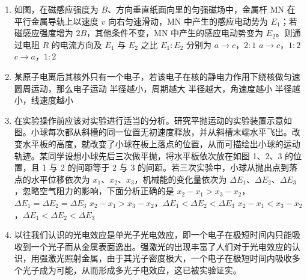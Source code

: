 \documentclass[\gkver]{gaokaozhenti}
\begin{document}
\begin{enumerate}
\item
如图，在磁感应强度为 $B$、方向垂直纸面向里的匀强磁场中，金属杆 MN 在平行金属导轨上以速度 $v$ 向右匀速滑动，MN 中产生的感应电动势为 $E_{1}$；若磁感应强度增为 $2B$，其他条件不变，MN 中产生的感应电动势变为 $E_{2}$。则通过电阻 $R$ 的电流方向及 $E_{1}$ 与 $E_{2}$ 之比 $E_{1}:E_{2}$ 分别为
{$a\to c$，$2:1$}
{$a\to c$，$1:2$}
{$c\to a$，$1:2$}

\item
某原子电离后其核外只有一个电子，若该电子在核的静电力作用下绕核做匀速圆周运动，那么电子运动
{半径越小，周期越大}
{半径越大，角速度越小}
{半径越小，线速度越小}

\item
在实验操作前应该对实验进行适当的分析。研究平抛运动的实验装置示意如图。小球每次都从斜槽的同一位置无初速度释放，并从斜槽末端水平飞出。改变水平板的高度，就改变了小球在板上落点的位置，从而可描绘出小球的运动轨迹。某同学设想小球先后三次做平抛，将水平板依次放在如图 1、2、3 的位置，且 1 与 2 的间距等于 2 与 3 的间距。若三次实验中，小球从抛出点到落点的水平位移依次为 $x_{1}$、$x_{2}$、$x_{3}$，机械能的变化量依次为 $\Delta E_{1}$、$\Delta E_{2}$、$\Delta E_{3}$，忽略空气阻力的影响，下面分析正确的是
{$x_{2}-x_{1}>x_{3}-x_{2}$，$\Delta E_{1}=\Delta E_{2}=\Delta E_{3}$}
{$x_{2}-x_{1}>x_{3}-x_{2}$，$\Delta E_{1}<\Delta E_{2}<\Delta E_{3}$}
{$x_{2}-x_{1}<x_{3}-x_{2}$，$\Delta E_{1}<\Delta E_{2}<\Delta E_{3}$}

\item
以往我们认识的光电效应是单光子光电效应，即一个电子在极短时间内只能吸收到一个光子而从金属表面逸出。强激光的出现丰富了人们对于光电效应的认识，用强激光照射金属，由于其光子密度极大，一个电子在极短时间内吸收多个光子成为可能，从而形成多光子电效应，这已被实验证实。


\end{enumerate}
\end{document}
